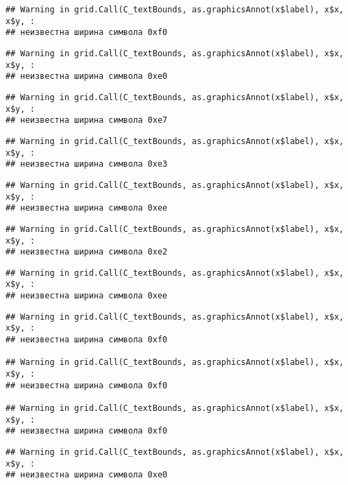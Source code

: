 \documentclass[
]{article}
\begin{document}
\begin{verbatim}
## Warning in grid.Call(C_textBounds, as.graphicsAnnot(x$label), x$x, x$y, :
## неизвестна ширина символа 0xf0
\end{verbatim}

\begin{verbatim}
## Warning in grid.Call(C_textBounds, as.graphicsAnnot(x$label), x$x, x$y, :
## неизвестна ширина символа 0xe0
\end{verbatim}

\begin{verbatim}
## Warning in grid.Call(C_textBounds, as.graphicsAnnot(x$label), x$x, x$y, :
## неизвестна ширина символа 0xe7
\end{verbatim}

\begin{verbatim}
## Warning in grid.Call(C_textBounds, as.graphicsAnnot(x$label), x$x, x$y, :
## неизвестна ширина символа 0xe3
\end{verbatim}

\begin{verbatim}
## Warning in grid.Call(C_textBounds, as.graphicsAnnot(x$label), x$x, x$y, :
## неизвестна ширина символа 0xee
\end{verbatim}

\begin{verbatim}
## Warning in grid.Call(C_textBounds, as.graphicsAnnot(x$label), x$x, x$y, :
## неизвестна ширина символа 0xe2
\end{verbatim}

\begin{verbatim}
## Warning in grid.Call(C_textBounds, as.graphicsAnnot(x$label), x$x, x$y, :
## неизвестна ширина символа 0xee
\end{verbatim}

\begin{verbatim}
## Warning in grid.Call(C_textBounds, as.graphicsAnnot(x$label), x$x, x$y, :
## неизвестна ширина символа 0xf0

## Warning in grid.Call(C_textBounds, as.graphicsAnnot(x$label), x$x, x$y, :
## неизвестна ширина символа 0xf0

## Warning in grid.Call(C_textBounds, as.graphicsAnnot(x$label), x$x, x$y, :
## неизвестна ширина символа 0xf0
\end{verbatim}

\begin{verbatim}
## Warning in grid.Call(C_textBounds, as.graphicsAnnot(x$label), x$x, x$y, :
## неизвестна ширина символа 0xe0
\end{verbatim}
\end{document}
